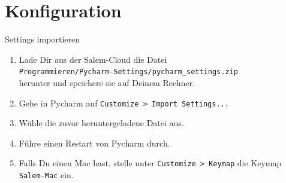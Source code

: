 \section{Konfiguration}

\begin{frame}
\begin{block}{Settings importieren}
\vspace{2pt}
\begin{enumerate}
\item Lade Dir aus der Salem-Cloud die Datei \\ \texttt{Programmieren/Pycharm-Settings/pycharm\_settings.zip} \\ herunter und speichere sie auf Deinem Rechner.
\item Gehe in Pycharm auf \texttt{Customize > Import Settings...}
\item Wähle die zuvor heruntergeladene Datei aus. 
\item Führe einen Restart von Pycharm durch.
\item Falls Du einen Mac hast, stelle unter \texttt{Customize > Keymap} die Keymap \texttt{Salem-Mac} ein. 
\end{enumerate}
\end{block}
\end{frame}
	
